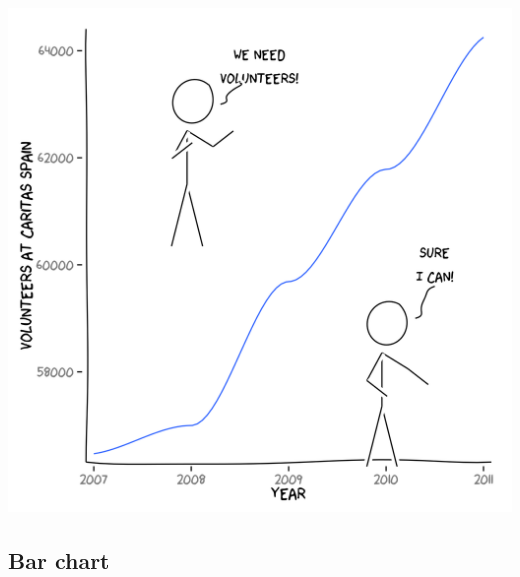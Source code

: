 \documentclass[10pt]{article}
\begin{document}
\begin{center}
\includegraphics{xkcd-intro-014}
\end{center}

\subsection{Bar chart}
\end{document}
